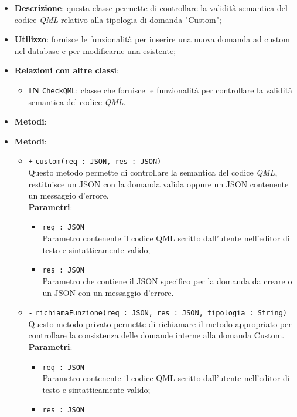 \begin{itemize}
	\item \textbf{Descrizione}: questa classe  permette di controllare la validità semantica del codice \textit{QML} relativo alla tipologia di domanda "Custom";
	\item \textbf{Utilizzo}: fornisce le funzionalità per inserire una nuova domanda ad custom nel database e per modificarne una esistente;
	\item \textbf{Relazioni con altre classi}:
	\begin{itemize}
		\item \textbf{IN} \texttt{CheckQML}: classe che fornisce le funzionalità per controllare la validità semantica del codice \textit{QML}.
	\end{itemize}
	\item \textbf{Metodi}:
	\item \textbf{Metodi}:
	\begin{itemize}
		\item \texttt{+} \texttt{custom(req : JSON, res : JSON)} \\
		Questo metodo permette di controllare la semantica del codice \textit{QML}, restituisce un JSON con la domanda valida oppure un JSON contenente un messaggio d'errore. \\
		\textbf{Parametri}:
		\begin{itemize}
			\item \texttt{req : JSON} \\
			Parametro contenente il codice QML scritto dall'utente nell'editor di testo e sintatticamente valido;
			\item \texttt{res : JSON} \\
			Parametro che contiene il JSON specifico per la domanda da creare o un JSON con un messaggio d'errore.
		\end{itemize}
		\item \texttt{-} \texttt{richiamaFunzione(req : JSON, res : JSON, tipologia : String)} \\
		Questo metodo privato permette di richiamare il metodo appropriato per controllare la consistenza delle domande interne alla domanda Custom. \\
		\textbf{Parametri}:
		\begin{itemize}
			\item \texttt{req : JSON} \\
			Parametro contenente il codice QML scritto dall'utente nell'editor di testo e sintatticamente valido;
			\item \texttt{res : JSON} \\

\end{itemize}
\end{itemize}
\end{itemize}
